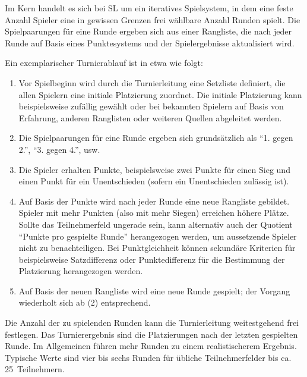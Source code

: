 \documentclass[DIV=15, 10pt]{scrartcl}
\begin{document}
Im Kern handelt es sich bei SL um ein iteratives Spielsystem, in dem eine feste Anzahl Spieler eine in gewissen Grenzen frei wählbare Anzahl Runden spielt. Die Spielpaarungen für eine Runde ergeben sich aus einer Rangliste, die nach jeder Runde auf Basis eines Punktesystems und der Spielergebnisse aktualisiert wird.

Ein exemplarischer Turnierablauf ist in etwa wie folgt:

\begin{enumerate}

\item Vor Spielbeginn wird durch die Turnierleitung eine Setzliste definiert, die allen Spielern eine initiale Platzierung zuordnet. Die initiale Platzierung kann beispielsweise zufällig gewählt oder bei bekannten Spielern auf Basis von Erfahrung, anderen Ranglisten oder weiteren Quellen abgeleitet werden.

\item Die Spielpaarungen für eine Runde ergeben sich grundsätzlich als "`1. gegen 2."', "`3. gegen 4."', usw.

\item Die Spieler erhalten Punkte, beispielsweise zwei Punkte für einen Sieg und einen Punkt für ein Unentschieden (sofern ein Unentschieden zulässig ist).

\item Auf Basis der Punkte wird nach jeder Runde eine neue Rangliste gebildet. Spieler mit mehr Punkten (also mit mehr Siegen) erreichen höhere Plätze. Sollte das Teilnehmerfeld ungerade sein, kann alternativ auch der Quotient "`Punkte pro gespielte Runde"' herangezogen werden, um aussetzende Spieler nicht zu benachteiligen. Bei Punktgleichheit können sekundäre Kriterien für beispielsweise Satzdifferenz oder Punktedifferenz für die Bestimmung der Platzierung herangezogen werden.

\item Auf Basis der neuen Rangliste wird eine neue Runde gespielt; der Vorgang wiederholt sich ab (2) entsprechend.

\end{enumerate}

Die Anzahl der zu spielenden Runden kann die Turnierleitung weitestgehend frei festlegen. Das Turnierergebnis sind die Platzierungen nach der letzten gespielten Runde. Im Allgemeinen führen mehr Runden zu einem realistischerem Ergebnis. Typische Werte sind vier bis sechs Runden für übliche Teilnehmerfelder bis ca. 25~Teilnehmern.
\end{document}
